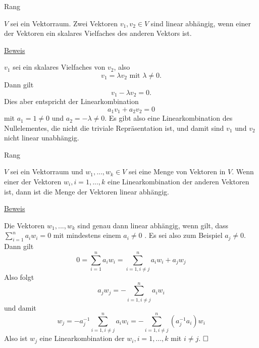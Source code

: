 \documentclass[
  8pt,
  ignorenonframetext,
]{beamer}
\begin{document}
\begin{frame}{Rang}
\protect\hypertarget{rang-2}{}
\small
\begin{theorem}
\justifying
\normalfont
$V$ sei ein Vektorraum. Zwei Vektoren $v_1, v_2 \in V$ sind linear abhängig,
wenn einer der Vektoren ein skalares Vielfaches des anderen Vektors ist.
\end{theorem}
\footnotesize

\underline{Beweis} \vspace{1mm}

\(v_1\) sei ein skalares Vielfaches von \(v_2\), also \begin{equation}
v_1 = \lambda v_2 \mbox{ mit } \lambda \neq 0.
\end{equation} Dann gilt \begin{equation}
v_1 - \lambda v_2 = 0.
\end{equation} Dies aber entspricht der Linearkombination
\begin{equation}
a_1v_1 + a_2v_2 = 0
\end{equation} mit \(a_1 = 1 \neq 0\) und \(a_2 = -\lambda \neq 0\). Es
gibt also eine Linearkombination des Nullelementes, die nicht die
triviale Repräsentation ist, und damit sind \(v_1\) und \(v_2\) nicht
linear unabhängig.
\end{frame}

\begin{frame}{Rang}
\protect\hypertarget{rang-3}{}
\small
\begin{theorem}
\justifying
\normalfont
$V$ sei ein Vektorraum und $w_1,...,w_k \in V$ sei eine Menge von Vektoren in $V$.
Wenn einer der Vektoren $w_i, i = 1,...,k$ eine Linearkombination der anderen
Vektoren ist, dann ist die Menge der Vektoren linear abhängig.
\end{theorem}

\footnotesize

\underline{Beweis}

Die Vektoren \(w_1,...,w_k\) sind genau dann linear abhängig, wenn gilt,
dass \(\sum_{i=1}^n a_i w_i = 0\) mit mindestens einem \(a_i \neq 0\) .
Es sei also zum Beispiel \(a_j \neq 0\). Dann gilt \begin{equation}
0 = \sum_{i=1}^n a_i w_i = \sum_{i=1, i \neq j}^n a_i w_i + a_jw_j
\end{equation} Also folgt \begin{equation}
a_jw_j  = - \sum_{i=1, i \neq j}^n a_i w_i
\end{equation} und damit \begin{equation}
w_j  = - a_j^{-1}\sum_{i=1, i \neq j}^n a_i w_i = - \sum_{i=1, i \neq j}^n (a_j^{-1}a_i) w_i
\end{equation} Also ist \(w_j\) eine Linearkombination der
\(w_i, i = 1,...,k\) mit \(i \neq j\). \(\hfill \Box\)
\end{frame}
\end{document}

